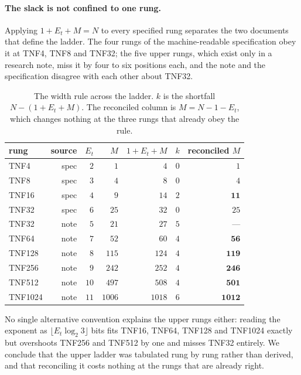 \paragraph{The slack is not confined to one rung.} Applying $1 + E_t + M = N$ to
every specified rung separates the two documents that define the ladder. The four
rungs of the machine-readable specification obey it at TNF4, TNF8 and TNF32;
the five upper rungs, which exist only in a research note, miss it by four to six
positions each, and the note and the specification disagree with each other about
TNF32.

\begin{table}[t]\centering
\caption{The width rule across the ladder. $k$ is the shortfall
$N - (1 + E_t + M)$. The reconciled column is $M = N - 1 - E_t$, which changes
nothing at the three rungs that already obey the rule.}
\label{tab:ladder-sweep}
\begin{tabular}{lrrrrrr}
\toprule
rung & source & $E_t$ & $M$ & $1{+}E_t{+}M$ & $k$ & reconciled $M$ \\
\midrule
TNF4    & spec & $2$  & $1$    & $4$    & $0$ & $1$ \\
TNF8    & spec & $3$  & $4$    & $8$    & $0$ & $4$ \\
TNF16   & spec & $4$  & $9$    & $14$   & $2$ & $\mathbf{11}$ \\
TNF32   & spec & $6$  & $25$   & $32$   & $0$ & $25$ \\
TNF32   & note & $5$  & $21$   & $27$   & $5$ & --- \\
TNF64   & note & $7$  & $52$   & $60$   & $4$ & $\mathbf{56}$ \\
TNF128  & note & $8$  & $115$  & $124$  & $4$ & $\mathbf{119}$ \\
TNF256  & note & $9$  & $242$  & $252$  & $4$ & $\mathbf{246}$ \\
TNF512  & note & $10$ & $497$  & $508$  & $4$ & $\mathbf{501}$ \\
TNF1024 & note & $11$ & $1006$ & $1018$ & $6$ & $\mathbf{1012}$ \\
\bottomrule
\end{tabular}
\end{table}

No single alternative convention explains the upper rungs either: reading the
exponent as $\lfloor E_t\log_2 3\rfloor$ bits fits TNF16, TNF64, TNF128 and
TNF1024 exactly but overshoots TNF256 and TNF512 by one and misses TNF32
entirely. We conclude that the upper ladder was tabulated rung by rung rather than
derived, and that reconciling it costs nothing at the rungs that are already
right.

